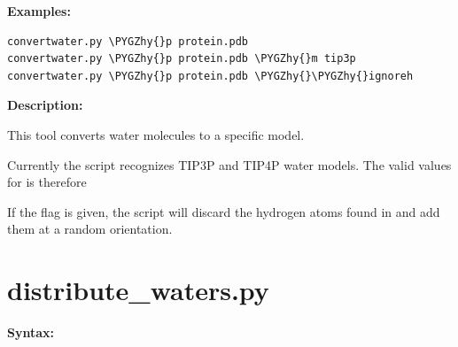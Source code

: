 \documentclass[letterpaper,10pt,english]{sphinxmanual}
\def\PYGZhy{\char`\-}
\begin{document}
\textbf{Examples:}

\begin{Verbatim}[frame=single,commandchars=\\\{\}]
convertwater.py \PYGZhy{}p protein.pdb
convertwater.py \PYGZhy{}p protein.pdb \PYGZhy{}m tip3p
convertwater.py \PYGZhy{}p protein.pdb \PYGZhy{}\PYGZhy{}ignoreh
\end{Verbatim}

\textbf{Description:}

This tool converts water molecules to a specific model.

Currently the script recognizes TIP3P and TIP4P water models. The valid values for  is therefore 

If the  flag is given, the script will discard the hydrogen atoms found in  and add them at a random orientation.


\section{distribute\_waters.py}
\label{tools:distribute-waters-py}
\textbf{Syntax:}
\end{document}
